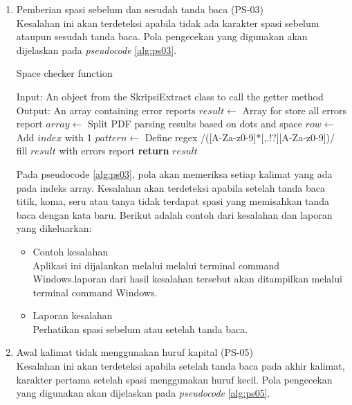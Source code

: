 \begin{enumerate}
	\item Pemberian spasi sebelum dan sesudah tanda baca (PS-03) \\
	Kesalahan ini akan terdeteksi apabila tidak ada karakter spasi sebelum ataupun sesudah tanda baca. Pola pengecekan yang digunakan akan dijelaskan pada \textit{pseudocode} \ref{alg:ps03}.
	
\begin{minipage}{1.0\linewidth}
\begin{algorithm}[H]
    \caption{Space checker function}
	\label{alg:ps03}
	\begin{algorithmic}[1]
    		\State Input: An object from the SkripsiExtract class to call the getter method
			\State Output: An array containing error reports
			\State $result \gets$ Array for store all errors report
			\State $array \gets$ Split PDF parsing results based on dots and space
    			\State $row \gets$ Add $index$ with 1
				\State $pattern \gets$ Define regex /([A-Za-z0-9]*[,.!?][A-Za-z0-9])/
                	\State fill $result$ with errors report
            	\EndIf
        	\EndFor
    		\State \textbf{return} $result$
    	\EndFunction
	\end{algorithmic}
\end{algorithm}
\end{minipage}
\medskip
	
	Pada pseudocode \ref{alg:ps03}, pola akan memeriksa setiap kalimat yang ada pada indeks array. Kesalahan akan terdeteksi apabila setelah tanda baca titik, koma, seru atau tanya tidak terdapat spasi yang memisahkan tanda baca dengan kata baru. Berikut adalah contoh dari kesalahan dan laporan yang dikeluarkan:
	
	\begin{itemize}
		\item Contoh kesalahan \\
		Aplikasi ini dijalankan melalui melalui terminal command Windows.laporan dari hasil kesalahan tersebut akan ditampilkan melalui terminal command Windows.
		\item Laporan kesalahan \\
		Perhatikan spasi sebelum atau setelah tanda baca.
	\end{itemize}
	
	\item Awal kalimat tidak menggunakan huruf kapital (PS-05) \\
	Kesalahan ini akan terdeteksi apabila setelah tanda baca pada akhir kalimat, karakter pertama setelah spasi menggunakan huruf kecil. Pola pengecekan yang digunakan akan dijelaskan pada \textit{pseudocode} \ref{alg:ps05}.


\end{enumerate}
